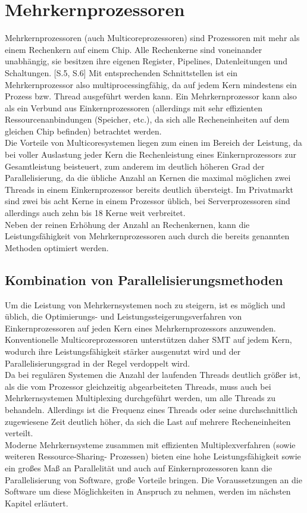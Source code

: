 \section{Mehrkernprozessoren}
Mehrkernprozessoren (auch Multicoreprozessoren) sind Prozessoren mit mehr als einem Rechenkern auf einem Chip. Alle Rechenkerne sind voneinander unabhängig, sie besitzen ihre eigenen Register, Pipelines, Datenleitungen und Schaltungen. \cite{Roloff_Multicore_Architekturen}[S.5, S.6] Mit entsprechenden Schnittstellen ist ein Mehrkernprozessor also multiprocessingfähig, da auf jedem Kern mindestens ein Prozess bzw. Thread ausgeführt werden kann. Ein Mehrkernprozessor kann also als ein Verbund aus Einkernprozessoren (allerdings mit sehr effizienten Ressourcenanbindungen (Speicher, etc.), da sich alle Recheneinheiten auf dem gleichen Chip befinden) betrachtet werden.\\
Die Vorteile von Multicoresystemen liegen zum einen im Bereich der Leistung, da bei voller Auslastung jeder Kern die Rechenleistung eines Einkernprozessors zur Gesamtleistung beisteuert, zum anderem im deutlich höheren Grad der Parallelisierung, da die übliche Anzahl an Kernen die maximal möglichen zwei Threads in einem Einkernprozessor bereits deutlich übersteigt. Im Privatmarkt sind zwei bis acht Kerne in einem Prozessor üblich, bei Serverprozessoren sind allerdings auch zehn bis 18 Kerne weit verbreitet. \cite{Stiller_Intels_Xeon} \\
Neben der reinen Erhöhung der Anzahl an Rechenkernen, kann die Leistungsfähigkeit von Mehrkernprozessoren auch durch die bereits genannten Methoden optimiert werden.

\subsection{Kombination von Parallelisierungsmethoden}
Um die Leistung von Mehrkernsystemen noch zu steigern, ist es möglich und üblich, die Optimierungs- und Leistungssteigerungsverfahren von Einkernprozessoren auf jeden Kern eines Mehrkernprozessors anzuwenden. Konventionelle Multicoreprozessoren unterstützen daher \ac{SMT} auf jedem Kern, wodurch ihre Leistungsfähigkeit stärker ausgenutzt wird und der Parallelisierungsgrad in der Regel verdoppelt wird.\\
Da bei regulären Systemen die Anzahl der laufenden Threads deutlich größer ist, als die vom Prozessor gleichzeitig abgearbeiteten Threads, muss auch bei Mehrkernsystemen Multiplexing durchgeführt werden, um alle Threads zu behandeln. Allerdings ist die Frequenz eines Threads oder seine durchschnittlich zugewiesene Zeit deutlich höher, da sich die Last auf mehrere Recheneinheiten verteilt.\\[0.5 cm]
Moderne Mehrkernsysteme zusammen mit effizienten Multiplexverfahren (sowie weiteren Ressource-Sharing- Prozessen) bieten eine hohe Leistungsfähigkeit sowie ein großes Maß an Parallelität und auch auf Einkernprozessoren kann die Parallelisierung von Software, große Vorteile bringen. Die Voraussetzungen an die Software um diese Möglichkeiten in Anspruch zu nehmen, werden im nächsten Kapitel erläutert.
